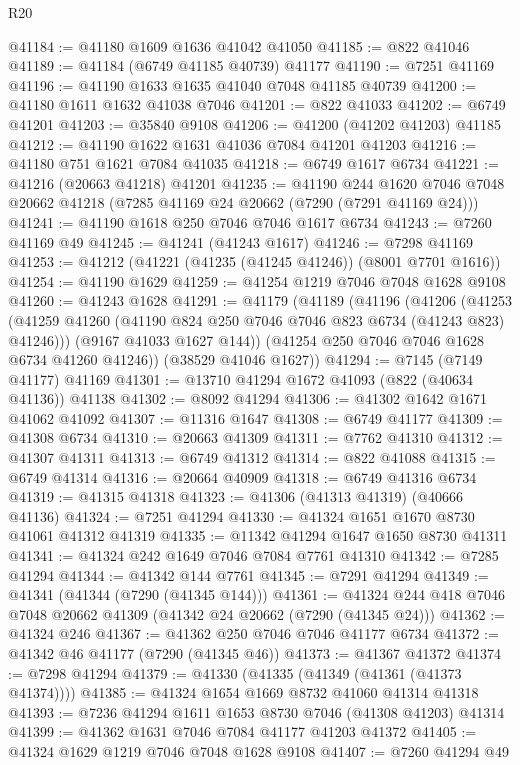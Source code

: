 \begin{lexlean}{R20}
\begin{coremodule}
{@41184 := @41180 @1609 @1636 @41042 @41050
@41185 := @822 @41046
@41189 := @41184 (@6749 @41185 @40739) @41177
@41190 := @7251 @41169
@41196 := @41190 @1633 @1635 @41040 @7048 @41185 @40739
@41200 := @41180 @1611 @1632 @41038 @7046
@41201 := @822 @41033
@41202 := @6749 @41201
@41203 := @35840 @9108
@41206 := @41200 (@41202 @41203) @41185
@41212 := @41190 @1622 @1631 @41036 @7084 @41201 @41203
@41216 := @41180 @751 @1621 @7084 @41035
@41218 := @6749 @1617 @6734
@41221 := @41216 (@20663 @41218) @41201
@41235 := @41190
    @244
    @1620
    @7046
    @7048
    @20662
    @41218
    (@7285 @41169 @24 @20662 (@7290 (@7291 @41169 @24)))
@41241 := @41190 @1618 @250 @7046 @7046 @1617 @6734
@41243 := @7260 @41169 @49
@41245 := @41241 (@41243 @1617)
@41246 := @7298 @41169
@41253 := @41212 (@41221 (@41235 (@41245 @41246)) (@8001 @7701 @1616))
@41254 := @41190 @1629
@41259 := @41254 @1219 @7046 @7048 @1628 @9108
@41260 := @41243 @1628
@41291 := @41179
    (@41189
      (@41196
        (@41206
          (@41253 (@41259 @41260 (@41190 @824 @250 @7046 @7046 @823 @6734 (@41243 @823) @41246)))
          (@9167 @41033 @1627 @144))
        (@41254 @250 @7046 @7046 @1628 @6734 @41260 @41246))
      (@38529 @41046 @1627))
@41294 := @7145 (@7149 @41177) @41169
@41301 := @13710 @41294 @1672 @41093 (@822 (@40634 @41136)) @41138
@41302 := @8092 @41294
@41306 := @41302 @1642 @1671 @41062 @41092
@41307 := @11316 @1647
@41308 := @6749 @41177
@41309 := @41308 @6734
@41310 := @20663 @41309
@41311 := @7762 @41310
@41312 := @41307 @41311
@41313 := @6749 @41312
@41314 := @822 @41088
@41315 := @6749 @41314
@41316 := @20664 @40909
@41318 := @6749 @41316 @6734
@41319 := @41315 @41318
@41323 := @41306 (@41313 @41319) (@40666 @41136)
@41324 := @7251 @41294
@41330 := @41324 @1651 @1670 @8730 @41061 @41312 @41319
@41335 := @11342 @41294 @1647 @1650 @8730 @41311
@41341 := @41324 @242 @1649 @7046 @7084 @7761 @41310
@41342 := @7285 @41294
@41344 := @41342 @144 @7761
@41345 := @7291 @41294
@41349 := @41341 (@41344 (@7290 (@41345 @144)))
@41361 := @41324 @244 @418 @7046 @7048 @20662 @41309 (@41342 @24 @20662 (@7290 (@41345 @24)))
@41362 := @41324 @246
@41367 := @41362 @250 @7046 @7046 @41177 @6734
@41372 := @41342 @46 @41177 (@7290 (@41345 @46))
@41373 := @41367 @41372
@41374 := @7298 @41294
@41379 := @41330 (@41335 (@41349 (@41361 (@41373 @41374))))
@41385 := @41324 @1654 @1669 @8732 @41060 @41314 @41318
@41393 := @7236 @41294 @1611 @1653 @8730 @7046 (@41308 @41203) @41314
@41399 := @41362 @1631 @7046 @7084 @41177 @41203 @41372
@41405 := @41324 @1629 @1219 @7046 @7048 @1628 @9108
@41407 := @7260 @41294 @49
}
\end{coremodule}
\end{lexlean}
